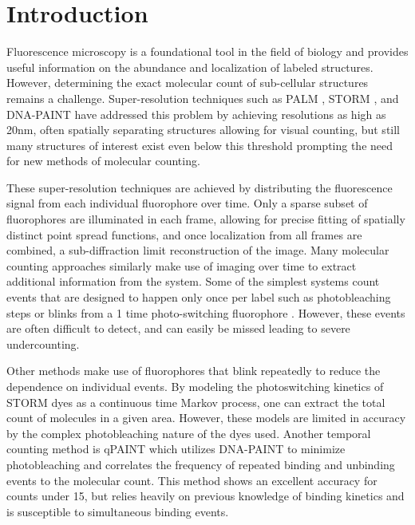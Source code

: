 \section{Introduction}

Fluorescence microscopy is a foundational tool in the field of biology and
provides useful information on the abundance and localization of labeled
structures.
%
  However, determining the exact molecular count of sub-cellular structures remains a
  challenge. Super-resolution techniques such as PALM \cite{betzig_imaging_2006}, 
  STORM \cite{rust_sub-diffraction-limit_2006}
  , and DNA-PAINT \cite{schnitzbauer_super-resolution_2017} have
  addressed this problem by achieving resolutions as high as 20nm, often
  spatially separating structures allowing for visual counting, but still many
  structures of interest exist even below this threshold prompting the need for
  new methods of molecular counting.

These super-resolution techniques are achieved by distributing the fluorescence
signal from each individual fluorophore over time.
%
  Only a sparse subset of fluorophores are illuminated in each frame, allowing
  for precise fitting of spatially distinct point spread functions, and once
  localization from all frames are combined, a sub-diffraction limit
  reconstruction of the image. Many molecular counting approaches similarly
  make use of imaging over time to extract additional information from the
  system. Some of the simplest systems count events that are designed to happen
  only once per label such as photobleaching steps \cite{Ulbrich_subunit_2007} or
  blinks from a 1 time photo-switching fluorophore
  \cite{gunzenhauser_quantitative_2012}. However, these events are often difficult to
  detect, and can easily be missed leading to severe undercounting.

Other methods make use of fluorophores that blink repeatedly to reduce the
dependence on individual events.
%
  By modeling the photoswitching kinetics of STORM dyes as a continuous time
  Markov process, \cite{patel_blinking_2021, rollins_stochastic_2015} one can extract the total count of molecules
  in a given area. However, these models are limited in accuracy by the complex
  photobleaching nature of the dyes used. Another temporal counting method is
  qPAINT \cite{jungmann_quantitative_2016} which utilizes DNA-PAINT to minimize photobleaching and
  correlates the frequency of repeated binding and unbinding events to the
  molecular count. This method shows an excellent accuracy for counts under 15,
  but relies heavily on previous knowledge of binding kinetics and is
  susceptible to simultaneous binding events.

